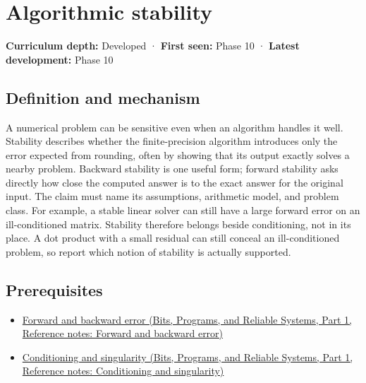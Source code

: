 \hypertarget{appendix-aa2bf0d79639}{}\label{referencestart:appendix-aa2bf0d79639}
\section{Algorithmic stability}\label{appendix-aa2bf0d79639-algorithmic-stability}

\hypertarget{appendix-aa2bf0d79639-algorithmic-stability}{}

\textbf{Curriculum depth:} Developed · \textbf{First seen:} Phase 10 · \textbf{Latest development:} Phase 10

\begin{allmightroledefinition}

\subsection{Definition and mechanism}\label{appendix-aa2bf0d79639-definition-and-mechanism}

\hypertarget{appendix-aa2bf0d79639-definition-and-mechanism}{}

A numerical problem can be sensitive even when an algorithm handles it well. Stability describes whether the finite-precision algorithm introduces only the error expected from rounding, often by showing that its output exactly solves a nearby problem. Backward stability is one useful form; forward stability asks directly how close the computed answer is to the exact answer for the original input. The claim must name its assumptions, arithmetic model, and problem class. For example, a stable linear solver can still have a large forward error on an ill-conditioned matrix. Stability therefore belongs beside conditioning, not in its place. A dot product with a small residual can still conceal an ill-conditioned problem, so report which notion of stability is actually supported.

\end{allmightroledefinition}

\subsection{Prerequisites}\label{appendix-aa2bf0d79639-prerequisites}

\hypertarget{appendix-aa2bf0d79639-prerequisites}{}

\begin{itemize}
\tightlist
\item
  \href{../01-Bits-Programs-and-Reliable-Systems-P01/main.pdf\#nameddest=appendix-a7fbaf6d1b1c}{Forward and backward error (Bits, Programs, and Reliable Systems, Part 1, Reference notes: Forward and backward error)}
\item
  \href{../01-Bits-Programs-and-Reliable-Systems-P01/main.pdf\#nameddest=appendix-8f6a01f284a7}{Conditioning and singularity (Bits, Programs, and Reliable Systems, Part 1, Reference notes: Conditioning and singularity)}
\end{itemize}

